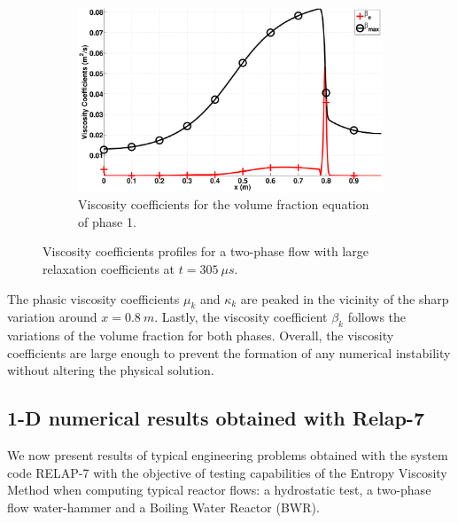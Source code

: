 \documentclass[preprint,10pt]{elsarticle}
\begin{document}
\begin{figure}[H]
        \begin{subfigure}[b]{0.495\textwidth}
                \centering
                \includegraphics[width=\textwidth]{figures/nozzle-aint-1e4_liquid_beta.eps}
                \caption{Viscosity coefficients for the volume fraction equation of phase 1.}
                \label{fig:nozzle-aint-1e4-beta}
        \end{subfigure}        
        \caption{Viscosity coefficients profiles for a two-phase flow with large relaxation coefficients at $t=305 \ \mu s$.}\label{fig:nozzle-aint-1e4-visc-coeff}
\end{figure}
%
The phasic viscosity coefficients $\mu_k$ and $\kappa_k$ are peaked in the vicinity of the sharp variation around $x=0.8 \ m$. Lastly, the viscosity coefficient $\beta_k$ follows the variations of the volume fraction for both phases. Overall, the viscosity coefficients are large enough to prevent the formation of any numerical instability without altering the physical solution.
%
\subsection{1-D numerical results obtained with Relap-7}\label{sec:1d-results-relap-7}
%
We now present results of typical engineering problems obtained with the system code RELAP-7 \cite{Berry_2014} with the objective of testing capabilities of the Entropy Viscosity Method when computing typical reactor flows: a hydrostatic test, a two-phase flow water-hammer and a Boiling Water Reactor (BWR).
  
%
\end{document}
